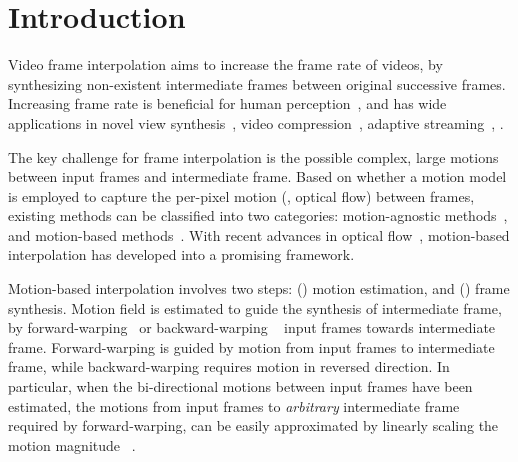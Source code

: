 \documentclass[10pt,twocolumn,letterpaper]{article}
\begin{document}
\section{Introduction}

Video frame interpolation aims to increase the frame rate of videos, by
synthesizing non-existent intermediate frames between original successive
frames. Increasing frame rate is beneficial for human
perception~\cite{kuroki2014effects}, and has wide applications in novel
view synthesis~\cite{flynn2016deepstereo}, video compression~\cite{lu2017novel},
adaptive streaming~\cite{wu2015modeling}, \etc.


The key challenge for frame interpolation is the possible complex, large motions
between input frames and intermediate frame. Based on whether a motion model is
employed to capture the per-pixel motion (\ie, optical flow) between frames,
existing methods can be classified into two categories: motion-agnostic
methods~\cite{niklaus2017video,meyer2018phasenet,cheng2020video,choi2020channel},
and motion-based
methods~\cite{jiang2018super,liu2017video,niklaus2018context,bao2019memc,niklaus2020softmax,park2020bmbc,park2021asymmetric,lu2022video}.
With recent advances in optical
flow~\cite{ilg2017flownet,hui2018liteflownet,sun2018pwc,teed2020raft},
motion-based interpolation has developed into a promising framework.


Motion-based interpolation involves two steps: () motion
estimation, and () frame synthesis. Motion field is estimated to
guide the synthesis of intermediate frame, by
forward-warping~\cite{niklaus2018context,niklaus2020softmax} or backward-warping
~\cite{jiang2018super,park2021asymmetric,sim2021xvfi} input frames towards
intermediate frame. Forward-warping is guided by motion from input frames to
intermediate frame, while backward-warping requires motion in reversed
direction. In particular, when the bi-directional motions between input frames
have been estimated, the motions from input frames to \textit{arbitrary}
intermediate frame required by forward-warping, can be easily approximated by
linearly scaling the motion magnitude
~\cite{niklaus2018context,niklaus2020softmax}.
\end{document}
